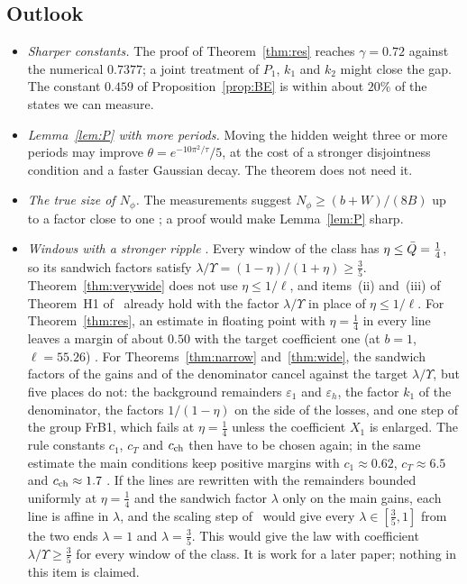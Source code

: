 \subsection{Outlook}

\begin{itemize}
\item \emph{Sharper constants.} The proof of Theorem~\ref{thm:res} reaches $\gamma=0.72$ against the numerical $0.7377$; a joint treatment of $P_1$, $k_1$ and $k_2$ might close the gap. The constant $0.459$ of Proposition~\ref{prop:BE} is within about $20\%$ of the states we can measure.
\item \emph{Lemma~\ref{lem:P} with more periods.} Moving the hidden weight three or more periods may improve $\theta=e^{-10\pi^2/\tau}/5$, at the cost of a stronger disjointness condition and a faster Gaussian decay. The theorem does not need it.
\item \emph{The true size of $N_\phi$.} The measurements suggest $N_\phi\ge(b+W)/(8B)$ up to a factor close to one \conjst; a proof would make Lemma~\ref{lem:P} sharp.
\item \emph{Windows with a stronger ripple} . Every window of the class has $\eta\le\bar Q=\frac14$, so its sandwich factors satisfy $\lambda/\Upsilon=(1-\eta)/(1+\eta)\ge\frac35$. Theorem~\ref{thm:verywide} does not use $\eta\le1/\ell$, and items~(ii) and~(iii) of Theorem~H1 of~\cite{H} already hold with the factor $\lambda/\Upsilon$ in place of $\eta\le1/\ell$. For Theorem~\ref{thm:res}, an estimate in floating point with $\eta=\frac14$ in every line leaves a margin of about $0.50$ with the target coefficient one (at $b=1$, $\ell=55.26$) \numst. For Theorems~\ref{thm:narrow} and~\ref{thm:wide}, the sandwich factors of the gains and of the denominator cancel against the target $\lambda/\Upsilon$, but five places do not: the background remainders $\varepsilon_1$ and $\varepsilon_h$, the factor $k_1$ of the denominator, the factors $1/(1-\eta)$ on the side of the losses, and one step of the group FrB1, which fails at $\eta=\frac14$ unless the coefficient $X_1$ is enlarged. The rule constants $c_1$, $c_T$ and $c_{\rm ch}$ then have to be chosen again; in the same estimate the main conditions keep positive margins with $c_1\approx0.62$, $c_T\approx6.5$ and $c_{\rm ch}\approx1.7$ \numst. If the lines are rewritten with the remainders bounded uniformly at $\eta=\frac14$ and the sandwich factor $\lambda$ only on the main gains, each line is affine in $\lambda$, and the scaling step of~\cite{H} would give every $\lambda\in[\frac35,1]$ from the two ends $\lambda=1$ and $\lambda=\frac35$. This would give the law with coefficient $\lambda/\Upsilon\ge\frac35$ for every window of the class. It is work for a later paper; nothing in this item is claimed.

\end{itemize}
